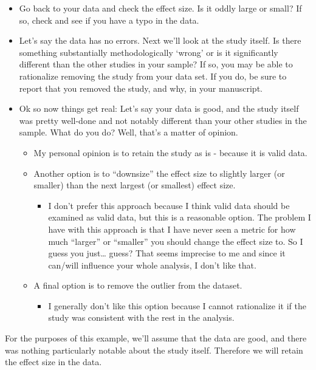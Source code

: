 \documentclass[
]{book}
\providecommand{\tightlist}{%
  \setlength{\itemsep}{0pt}\setlength{\parskip}{0pt}}
\begin{document}
\begin{itemize}
\item
  Go back to your data and check the effect size. Is it oddly large or small? If so, check and see if you have a typo in the data.
\item
  Let's say the data has no errors. Next we'll look at the study itself. Is there something substantially methodologically `wrong' or is it significantly different than the other studies in your sample? If so, you may be able to rationalize removing the study from your data set. If you do, be sure to report that you removed the study, and why, in your manuscript.
\item
  Ok so now things get real: Let's say your data is good, and the study itself was pretty well-done and not notably different than your other studies in the sample. What do you do? Well, that's a matter of opinion.

  \begin{itemize}
  \item
    My personal opinion is to retain the study as is - because it is valid data.
  \item
    Another option is to ``downsize'' the effect size to slightly larger (or smaller) than the next largest (or smallest) effect size.

    \begin{itemize}
    \tightlist
    \item
      I don't prefer this approach because I think valid data should be examined as valid data, but this is a reasonable option. The problem I have with this approach is that I have never seen a metric for how much ``larger'' or ``smaller'' you should change the effect size to. So I guess you just\ldots{} guess? That seems imprecise to me and since it can/will influence your whole analysis, I don't like that.
    \end{itemize}
  \item
    A final option is to remove the outlier from the dataset.

    \begin{itemize}
    \tightlist
    \item
      I generally don't like this option because I cannot rationalize it if the study was consistent with the rest in the analysis.
    \end{itemize}
  \end{itemize}
\end{itemize}

For the purposes of this example, we'll assume that the data are good, and there was nothing particularly notable about the study itself. Therefore we will retain the effect size in the data.
\end{document}
